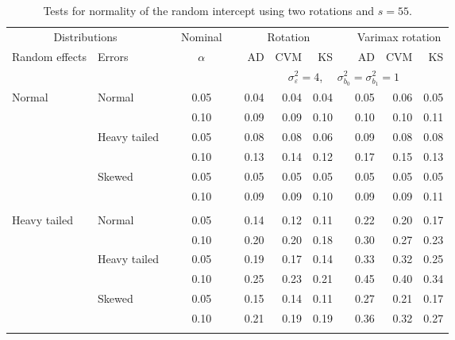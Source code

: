 \begin{table}[ht]
\caption{\label{tab:simb0s55}Tests for normality of the random intercept using two rotations and $s = 55$.}
\begin{scriptsize}
\begin{center}
\begin{tabular}{ll p{.1cm} c p{.1cm} rrr p{.1cm} rrr}
  \hline
  \multicolumn{2}{c}{Distributions}& & Nominal & &  \multicolumn{3}{c}{Rotation} & & \multicolumn{3}{c}{Varimax rotation} \\ \cline{1-2} \cline{6-8} \cline{10-12}   
  Random effects & Errors & & $\alpha$ & & AD & CVM & KS & & AD & CVM & KS \\ 
   \hline
& && && \multicolumn{7}{c}{$\sigma_{\varepsilon}^2 = 4$, \ \ $\sigma_{b_0}^2 = \sigma_{b_1}^2 = 1$} \\ \cline{6-12}
\rowcolor{gray!20}Normal       & Normal       && 0.05 &&   0.04 & 0.04 & 0.04 && 0.05 & 0.06 & 0.05 \\ 
\rowcolor{gray!20}             &              && 0.10 &&   0.09 & 0.09 & 0.10 && 0.10 & 0.10 & 0.11 \\ 
\rowcolor{gray!20}             & Heavy tailed && 0.05 &&   0.08 & 0.08 & 0.06 && 0.09 & 0.08 & 0.08 \\ 
\rowcolor{gray!20}             &              && 0.10 &&   0.13 & 0.14 & 0.12 && 0.17 & 0.15 & 0.13 \\ 
\rowcolor{gray!20}             & Skewed       && 0.05 &&   0.05 & 0.05 & 0.05 && 0.05 & 0.05 & 0.05 \\ 
\rowcolor{gray!20}             &              && 0.10 &&   0.09 & 0.09 & 0.10 && 0.09 & 0.09 & 0.11 \\ 
             &&&&&&&&&&&\\
Heavy tailed & Normal       && 0.05 &&   0.14 & 0.12 & 0.11 && 0.22 & 0.20 & 0.17 \\ 
             &              && 0.10 &&   0.20 & 0.20 & 0.18 && 0.30 & 0.27 & 0.23 \\ 
             & Heavy tailed && 0.05 &&   0.19 & 0.17 & 0.14 && 0.33 & 0.32 & 0.25 \\ 
             &              && 0.10 &&   0.25 & 0.23 & 0.21 && 0.45 & 0.40 & 0.34 \\ 
             & Skewed       && 0.05 &&   0.15 & 0.14 & 0.11 && 0.27 & 0.21 & 0.17 \\ 
             &              && 0.10 &&   0.21 & 0.19 & 0.19 && 0.36 & 0.32 & 0.27 \\ 
             &&&&&&&&&&&\\

\end{tabular}
\end{center}
\end{scriptsize}
\end{table}
